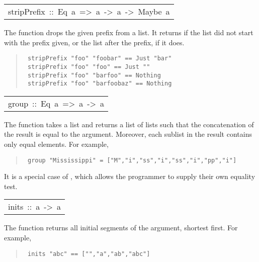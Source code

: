 \begin{haddockdesc}
\item[\begin{tabular}{@{}l}
stripPrefix\ ::\ Eq\ a\ =>\ {\char 91}a{\char 93}\ ->\ {\char 91}a{\char 93}\ ->\ Maybe\ {\char 91}a{\char 93}
\end{tabular}]\haddockbegindoc
The  function drops the given prefix from a list.
 It returns  if the list did not start with the prefix
 given, or  the list after the prefix, if it does.
\par
\begin{quote}
{\haddockverb\begin{verbatim}
 stripPrefix "foo" "foobar" == Just "bar"
 stripPrefix "foo" "foo" == Just ""
 stripPrefix "foo" "barfoo" == Nothing
 stripPrefix "foo" "barfoobaz" == Nothing
\end{verbatim}}
\end{quote}

\end{haddockdesc}
\begin{haddockdesc}
\item[\begin{tabular}{@{}l}
group\ ::\ Eq\ a\ =>\ {\char 91}a{\char 93}\ ->\ {\char 91}{\char 91}a{\char 93}{\char 93}
\end{tabular}]\haddockbegindoc
The  function takes a list and returns a list of lists such
 that the concatenation of the result is equal to the argument.  Moreover,
 each sublist in the result contains only equal elements.  For example,
\par
\begin{quote}
{\haddockverb\begin{verbatim}
 group "Mississippi" = ["M","i","ss","i","ss","i","pp","i"]
\end{verbatim}}
\end{quote}
It is a special case of , which allows the programmer to supply
 their own equality test.
\par

\end{haddockdesc}
\begin{haddockdesc}
\item[\begin{tabular}{@{}l}
inits\ ::\ {\char 91}a{\char 93}\ ->\ {\char 91}{\char 91}a{\char 93}{\char 93}
\end{tabular}]\haddockbegindoc
The  function returns all initial segments of the argument,
 shortest first.  For example,
\par
\begin{quote}
{\haddockverb\begin{verbatim}
 inits "abc" == ["","a","ab","abc"]
\end{verbatim}}
\end{quote}

\end{haddockdesc}
